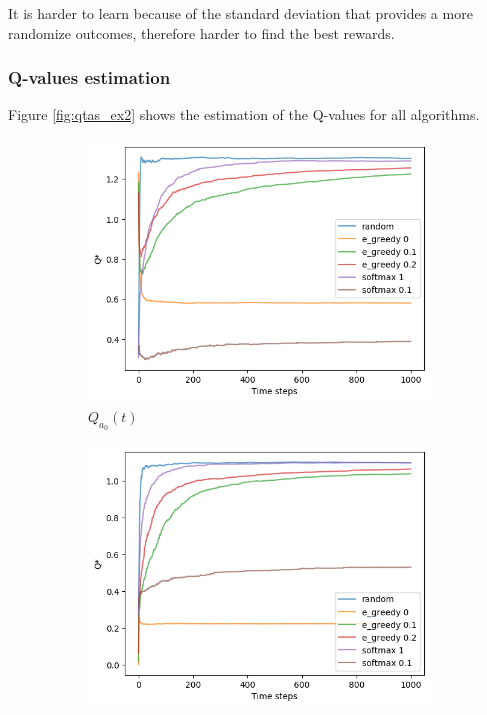 \documentclass[letterpaper]{article}
\begin{document}
It is harder to learn because of the standard deviation that provides
a more randomize outcomes, therefore harder to find the best rewards.


\subsubsection{Q-values estimation}


Figure \ref{fig:qtas_ex2}
shows the estimation of the Q-values for all algorithms.

\begin{figure}[H]
  \begin{subfigure}{.5\textwidth}
    \centering
    \includegraphics[width=1\linewidth]{images/assign3/ex2/qta_0}
    \caption{$Q_{a_{0}}(t)$}
    \label{fig:qta_0_ex2}
  \end{subfigure}
  \begin{subfigure}{.5\textwidth}
    \centering
    \includegraphics[width=1\linewidth]{images/assign3/ex2/qta_1}

\end{subfigure}
\end{figure}
\end{document}

